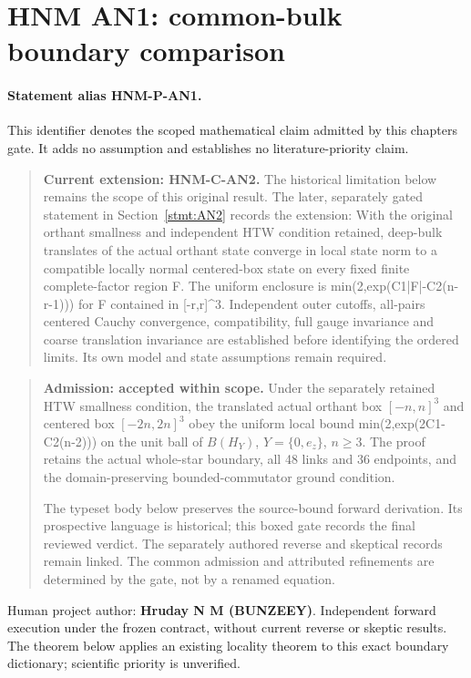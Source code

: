 \hypertarget{r29-an1-an1-forward-hnm-common-bulk-boundary-comparison}{%
\section{HNM AN1: common-bulk boundary comparison\workstar}\label{r29:an1:r29-an1-an1-forward-hnm-common-bulk-boundary-comparison}}
\paragraph{Statement alias HNM-P-AN1.}\label{stmt:AN1} This identifier denotes the scoped mathematical claim admitted by this chapter\textquotesingle s gate. It adds no assumption and establishes no literature-priority claim.
\begin{quote}\small\textbf{Current extension: HNM-C-AN2.} The historical limitation below remains the scope of this original result. The later, separately gated statement in Section~\ref{stmt:AN2} records the extension: With the original orthant smallness and independent HTW condition retained, deep-bulk translates of the actual orthant state converge in local state norm to a compatible locally normal centered-box state on every fixed finite complete-factor region F. The uniform enclosure is min(2,exp(C1|F|-C2(n-r-1))) for F contained in [-r,r]\textasciicircum{}3. Independent outer cutoffs, all-pairs centered Cauchy convergence, compatibility, full gauge invariance and coarse translation invariance are established before identifying the ordered limits. Its own model and state assumptions remain required.\end{quote}

\begin{quote}\small \textbf{Admission: accepted within scope.} Under the separately retained HTW smallness condition, the translated actual orthant box \([-n,n]^{3}\) and centered box \([-2n,2n]^{3}\) obey the uniform local bound min(2,exp(2C1-C2(n-2))) on the unit ball of \(B(H_Y)\), \(Y=\{0,e_z\}\), \(n\ge 3\). The proof retains the actual whole-star boundary, all 48 links and 36 endpoints, and the domain-preserving bounded-commutator ground condition.\par The typeset body below preserves the source-bound forward derivation. Its prospective language is historical; this boxed gate records the final reviewed verdict. The separately authored reverse and skeptical records remain linked. The common admission and attributed refinements are determined by the gate, not by a renamed equation.\end{quote}
Human project author: \textbf{Hruday N M (BUNZEEY)}. Independent forward execution under the frozen contract, without current reverse or skeptic results. The theorem below applies an existing locality theorem to this exact boundary dictionary; scientific priority is unverified.


